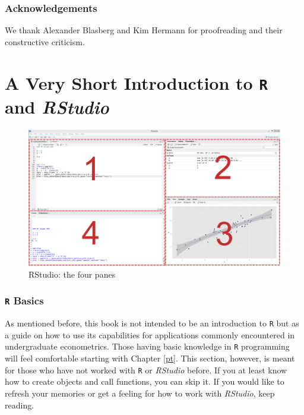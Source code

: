 \documentclass[]{book}
\theoremstyle{definition}
\theoremstyle{definition}
\theoremstyle{definition}
\theoremstyle{remark}
\begin{document}
\subsubsection*{Acknowledgements}\label{acknowledgements}

We thank Alexander Blasberg and Kim Hermann for proofreading and their
constructive criticism.

\section{\texorpdfstring{A Very Short Introduction to \texttt{R} and
\emph{RStudio}}{A Very Short Introduction to  and RStudio}}\label{a-very-short-introduction-to-and-rstudio}

\begin{figure}[h]

{\centering \includegraphics[width=1\linewidth]{images/rstudio} 

}

\caption{RStudio: the four panes}\label{fig:unnamed-chunk-7}
\end{figure}

\subsubsection*{\texorpdfstring{\texttt{R}
Basics}{ Basics}}\label{basics}

As mentioned before, this book is not intended to be an introduction to
\texttt{R} but as a guide on how to use its capabilities for
applications commonly encountered in undergraduate econometrics. Those
having basic knowledge in \texttt{R} programming will feel comfortable
starting with Chapter \ref{pt}. This section, however, is meant for
those who have not worked with \texttt{R} or \emph{RStudio} before. If
you at least know how to create objects and call functions, you can skip
it. If you would like to refresh your memories or get a feeling for how
to work with \emph{RStudio}, keep reading.
\end{document}

